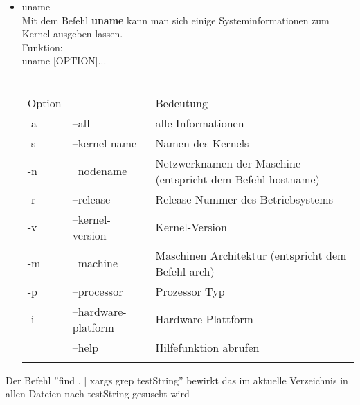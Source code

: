\begin{itemize}
\begin{tabular}{ll}
			\end{tabular}
			\newpage
			\item uname\\
			Mit dem Befehl \textbf{uname} kann man sich einige Systeminformationen zum Kernel ausgeben lassen.\\
			Funktion:\\
			uname [OPTION]...\\ \\
			\begin{tabular}{lll}
				Option & & Bedeutung \\
				-a & --all & alle Informationen\\
				-s & --kernel-name & Namen des Kernels\\
				-n & --nodename &  Netzwerknamen der Maschine (entspricht dem Befehl hostname)\\
				-r & --release & Release-Nummer des Betriebsystems\\
				-v & --kernel-version & Kernel-Version\\
				-m & --machine & Maschinen Architektur (entspricht dem Befehl arch)\\
				-p & --processor & Prozessor Typ\\
				-i & --hardware-platform & Hardware Plattform\\
				& --help & Hilfefunktion abrufen\\ \\
			\end{tabular}
		\end{itemize}
		Der Befehl ''find . | xargs grep testString'' bewirkt das im aktuelle Verzeichnis in allen Dateien nach testString gesuscht wird
